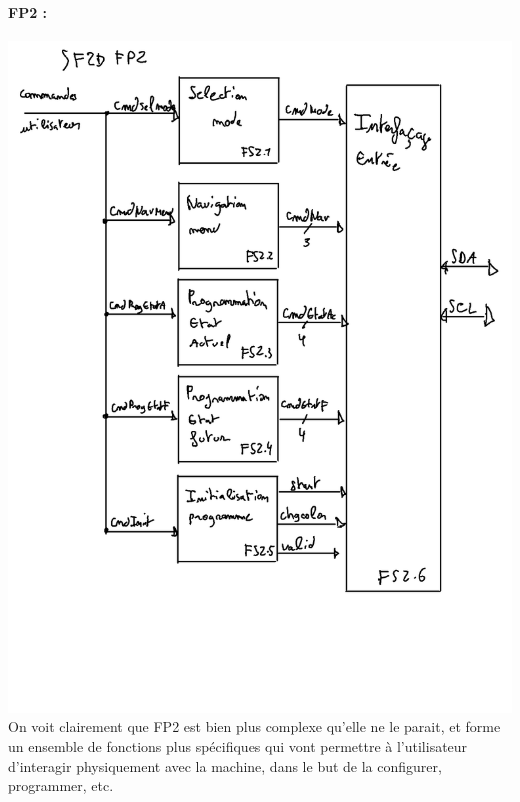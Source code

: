 \documentclass[12pt]{report}
\begin{document}
	\paragraph{FP2 :}
	\includegraphics[width=\textwidth]{img/SF2DFP2}
	On voit clairement que FP2 est bien plus complexe qu'elle ne le parait, et forme un ensemble de fonctions plus spécifiques qui vont permettre à l'utilisateur d'interagir physiquement avec la machine, dans le but de la configurer, programmer, etc.
\end{document}

